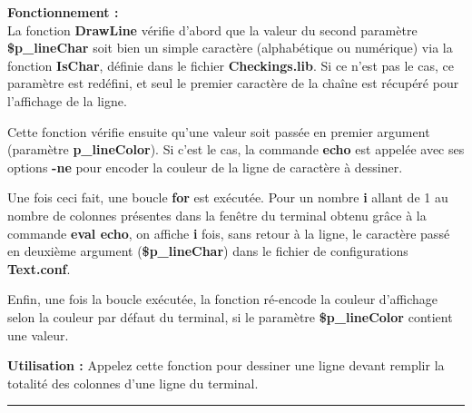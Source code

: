 \documentclass[a4paper,10pt]{article}
\begin{document}
\begin{justify}
    \textbf{Fonctionnement :}\\
    La fonction \textbf{\color{mauve}DrawLine} vérifie d'abord que la valeur du second paramètre \textbf{\color{orange}\$p\_lineChar} soit bien un simple caractère (alphabétique ou numérique) via la fonction \textbf{\color{mauve}IsChar}, définie dans le fichier \textbf{\color{lime}Checkings.lib}. Si ce n'est pas le cas, ce paramètre est redéfini, et seul le premier caractère de la chaîne est récupéré pour l'affichage de la ligne.
\end{justify}

\begin{justify}
    Cette fonction vérifie ensuite qu'une valeur soit passée en premier argument (paramètre \textbf{\color{orange}p\_lineColor}). Si c'est le cas, la commande \textbf{\color{gray}echo} est appelée avec ses options \textbf{\color{gray}-ne} pour encoder la couleur de la ligne de caractère à dessiner.
\end{justify}

\begin{justify}
    Une fois ceci fait, une boucle \textbf{for} est exécutée. Pour un nombre \textbf{i} allant de 1 au nombre de colonnes présentes dans la fenêtre du terminal obtenu grâce à la commande \textbf{\color{gray}eval echo}, on affiche \textbf{i} fois, sans retour à la ligne, le caractère passé en deuxième argument (\textbf{\color{orange}\$p\_lineChar}) dans le fichier de
configurations \textbf{\color{lime}Text.conf}.
\end{justify}

\begin{justify}
    Enfin, une fois la boucle exécutée, la fonction ré-encode la couleur d'affichage selon la couleur par défaut du terminal, si le paramètre \textbf{\color{orange}\$p\_lineColor} contient une valeur.
\end{justify}

\begin{justify}
    \textbf{Utilisation :}\linebreak
    Appelez cette fonction pour dessiner une ligne devant remplir la totalité des colonnes d'une ligne du terminal.\\
\end{justify}



\color{blue}\par\noindent\rule{\textwidth}{0.4pt}\color{white}\\[1\baselineskip]
\end{document}

